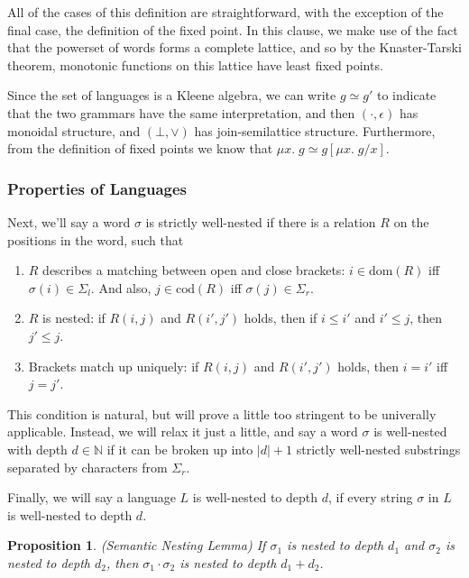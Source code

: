 \documentclass{article}
\newcommand{\fix}[2]{\mu {#1}.\;{#2}}
\newcommand{\nats}{\mathbb{N}}
\newtheorem{prop}{Proposition}
\begin{document}
All of the cases of this definition are straightforward, with the
exception of the final case, the definition of the fixed point. In
this clause, we make use of the fact that the powerset of words forms
a complete lattice, and so by the Knaster-Tarski theorem, monotonic
functions on this lattice have least fixed points.

Since the set of languages is a Kleene algebra, we can write $g \simeq
g'$ to indicate that the two grammars have the same interpretation,
and then $(\cdot, \epsilon)$ has monoidal structure, and $(\bot,
\vee)$ has join-semilattice structure. Furthermore, from the definition
of fixed points we know that $\fix{x}{g} \simeq g[\fix{x}{g}/x]$. 

\subsubsection{Properties of Languages}

Next, we'll say a word $\sigma$ is strictly well-nested if there is a
relation $R$ on the positions in the word, such that

\begin{enumerate}
\item $R$ describes a matching between open and close brackets: 
      $i \in \mathrm{dom}(R)$ iff $\sigma(i) \in \Sigma_l$. And also,
      $j \in \mathrm{cod}(R)$ iff $\sigma(j) \in \Sigma_r$.
\item $R$ is nested: if $R(i, j)$ and $R(i', j')$ holds, then if $i \leq i'$ and $i' \leq j$, then $j' \leq j$. 
\item Brackets match up uniquely: if $R(i, j)$ and $R(i', j')$ holds, then $i = i'$ iff $j = j'$. 
\end{enumerate}

This condition is natural, but will prove a little too stringent to be
univerally applicable. Instead, we will relax it just a little, and
say a word $\sigma$ is well-nested with depth $d \in \nats$ if it can
be broken up into $|d| + 1$ strictly well-nested substrings separated
by characters from $\Sigma_r$.

Finally, we will say a language $L$ is well-nested to depth $d$, if
every string $\sigma$ in $L$ is well-nested to depth $d$.

\begin{prop}{(Semantic Nesting Lemma)}
If $\sigma_1$ is nested to depth $d_1$ and $\sigma_2$ is nested to depth $d_2$, then 
$\sigma_1\cdot\sigma_2$ is nested to depth $d_1 + d_2$.
\end{prop}
\end{document}
